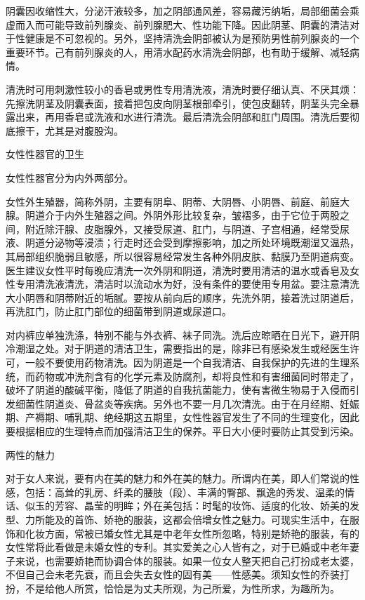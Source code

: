 \documentclass[12pt,UTF8]{ctexbook}
\begin{document}
阴囊因收缩性大，分泌汗液较多，加之阴部通风差，容易藏污纳垢，局部细菌会乘虚而入而可能导致前列腺炎、前列腺肥大、性功能下降。因此阴茎、阴囊的清洁对于性健康是不可忽视的。另外，坚持清洗会阴部被认为是预防男性前列腺炎的一个重要环节。己有前列腺炎的人，用清水配药水清洗会阴部，也有助于缓解、减轻病情。

清洗时可用刺激性较小的香皂或男性专用清洗液，清洗时要仔细认真、不厌其烦：先擦洗阴茎及阴囊表面，接着把包皮向阴茎根部牵引，使包皮翻转，阴茎头完全暴露出来，再用香皂或洗液和水进行清洗。最后清洗会阴部和肛门周围。清洗后要彻底擦干，尤其是对腹股沟。





女性性器官的卫生


女性性器官分为内外两部分。

女性外生殖器，简称外阴，主要有阴阜、阴蒂、大阴唇、小阴唇、前庭、前庭大腺。阴道介于内外生殖器之间。外阴外形比较复杂，皱褶多，由于它位于两股之间，附近除汗腺、皮脂腺外，又接受尿道、肛门，与阴道、子宫相通，经常受尿液、阴道分泌物等浸渍；行走时还会受到摩擦影响，加之所处环境既潮湿又温热，其局部组织脆弱且敏感，所以很容易经常发生各种外阴皮肤、黏膜乃至阴道病变。医生建议女性平时每晚应清洗一次外阴和阴道，清洗时要用清洁的温水或香皂及女性专用清洗液清洗，清洁时以流动水为好，没有条件的要使用专用盆。要注意清洗大小阴唇和阴蒂附近的垢腻。要按从前向后的顺序，先洗外阴，接着洗过阴道后，再洗肛门，防止肛门部位的细菌带到阴道或尿道口。

对内裤应单独洗涤，特别不能与外衣裤、袜子同洗。洗后应晾晒在日光下，避开阴冷潮湿之处。对于阴道的清洁卫生，需要指出的是，除非已有感染发生或经医生许可，一般不要使用药物清洗。因为阴道是一个自我清洁、自我保护的先进的生理系统，而药物或冲洗剂含有的化学元素及防腐剂，却将良性和有害细菌同时带走了，破坏了阴道的酸碱平衡，降低了阴道的自我抗菌能力，使有害微生物易于入侵而引发细菌性阴道炎、骨盆炎等疾病。另外也不要一月几次清洗。由于在月经期、妊娠期、产褥期、哺乳期、绝经期这五期里，女性性器官发生了不同的生理变化，因此要根据相应的生理特点而加强清洁卫生的保养。平日大小便时要防止其受到污染。





两性的魅力


对于女人来说，要有内在美的魅力和外在美的魅力。所谓内在美，即人们常说的性感，包括：高耸的乳房、纤柔的腰肢（段）、丰满的臀部、飘逸的秀发、温柔的情话、似玉的芳容、晶莹的明眸；外在美包括：时髦的妆饰、适度的化妆、娇美的发型、力所能及的首饰、娇艳的服装，这都会倍增女性之魅力。可现实生活中，在服饰和化妆方面，常被已婚女性尤其是中老年女性所忽略，特别是娇艳的服装，有的女性常将此看做是未婚女性的专利。其实爱美之心人皆有之，对于已婚或中老年妻子来说，也需要娇艳而协调合体的服装。如果一位女人整天把自己打扮成老太婆，不但自己会未老先衰，而且会失去女性的固有美——性感美。须知女性的乔装打扮，不是给他人所赏，恰恰是为丈夫所观，为己所爱，为性所求，为趣所为。
\end{document}

